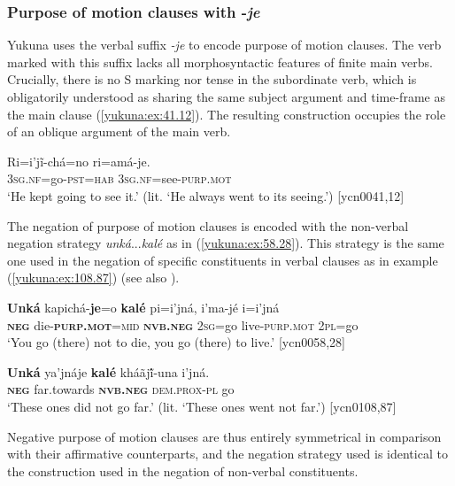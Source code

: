 \documentclass[output=paper,colorlinks,citecolor=brown]{langscibook}
\begin{document}
\subsubsection{Purpose of motion clauses with -\textit{je}}\label{yukuna:purp.mot}

Yukuna uses the verbal suffix \textit{-je} to encode purpose of motion clauses. The verb marked with this suffix lacks all morphosyntactic features of finite main verbs. Crucially, there is no S marking nor tense in the subordinate verb, which is obligatorily understood as sharing the same subject argument and time-frame as the main clause (\ref{yukuna:ex:41.12}). The resulting construction occupies the role of an oblique argument of the main verb. 

\ea\label{yukuna:ex:41.12}
\gll Ri=i'jĩ-chá=no ri=amá-je.\\
\textsc{3sg.nf}=go-\textsc{pst}=\textsc{hab} \textsc{3sg.nf}=see-\textsc{purp.mot} \\
\glt ‘He kept going to see it.’ (lit. ‘He always went to its seeing.’) [ycn0041,12]
\z

The negation of purpose of motion clauses is encoded with the non-verbal negation strategy \textit{unká}{...}\textit{kalé} as in (\ref{yukuna:ex:58.28}). This strategy is the same one used in the negation of specific constituents in verbal clauses as in example (\ref{yukuna:ex:108.87}) (see also ). 

\ea\label{yukuna:ex:58.28}
\gll \textbf{Unká} kapichá-\textbf{je}=o \textbf{kalé} pi=i'jná, i'ma-jé i=i'jná\\
\textbf{\textsc{neg}} die-\textbf{\textsc{purp.mot}}=\textsc{mid} \textbf{\textsc{nvb.neg}} \textsc{2sg}=go live-\textsc{purp.mot} \textsc{2pl}=go\\
\glt ‘You go (there) not to die, you go (there) to live.’ [ycn0058,28]
\z

\ea\label{yukuna:ex:108.87}
\gll \textbf{Unká} ya'jnáje \textbf{kalé} kháãjĩ́-una i'jná.\\
\textbf{\textsc{neg}} far.towards \textbf{\textsc{nvb.neg}} \textsc{dem.prox}-\textsc{pl} go\\
\glt ‘These ones did not go far.’ (lit. ‘These ones went not far.') [ycn0108,87]
\z

Negative purpose of motion clauses are thus entirely symmetrical in comparison with their affirmative counterparts, and the negation strategy used is identical to the construction used in the negation of non-verbal constituents. 
\end{document}
